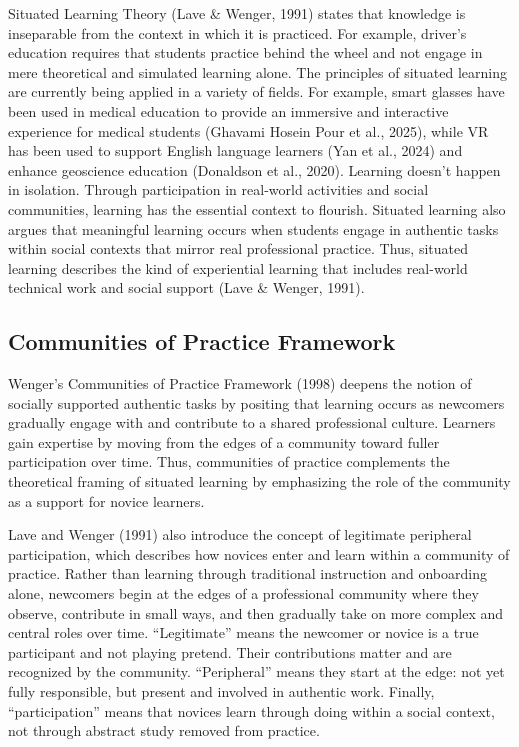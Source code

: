 \documentclass[
  12pt]{article}
\begin{document}
Situated Learning Theory (Lave \& Wenger, 1991) states that knowledge is
inseparable from the context in which it is practiced. For example,
driver's education requires that students practice behind the wheel and
not engage in mere theoretical and simulated learning alone. The
principles of situated learning are currently being applied in a variety
of fields. For example, smart glasses have been used in medical
education to provide an immersive and interactive experience for medical
students (Ghavami Hosein Pour et al., 2025), while VR has been used to
support English language learners (Yan et al., 2024) and enhance
geoscience education (Donaldson et al., 2020). Learning doesn't happen
in isolation. Through participation in real-world activities and social
communities, learning has the essential context to flourish. Situated
learning also argues that meaningful learning occurs when students
engage in authentic tasks within social contexts that mirror real
professional practice. Thus, situated learning describes the kind of
experiential learning that includes real-world technical work and social
support (Lave \& Wenger, 1991).

\subsection{Communities of Practice
Framework}\label{communities-of-practice-framework}

Wenger's Communities of Practice Framework (1998) deepens the notion of
socially supported authentic tasks by positing that learning occurs as
newcomers gradually engage with and contribute to a shared professional
culture. Learners gain expertise by moving from the edges of a community
toward fuller participation over time. Thus, communities of practice
complements the theoretical framing of situated learning by emphasizing
the role of the community as a support for novice learners.

Lave and Wenger (1991) also introduce the concept of legitimate
peripheral participation, which describes how novices enter and learn
within a community of practice. Rather than learning through traditional
instruction and onboarding alone, newcomers begin at the edges of a
professional community where they observe, contribute in small ways, and
then gradually take on more complex and central roles over time.
``Legitimate'' means the newcomer or novice is a true participant and
not playing pretend. Their contributions matter and are recognized by
the community. ``Peripheral'' means they start at the edge: not yet
fully responsible, but present and involved in authentic work. Finally,
``participation'' means that novices learn through doing within a social
context, not through abstract study removed from practice.
\end{document}
